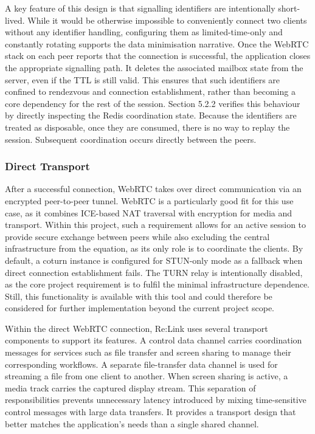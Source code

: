 \documentclass[12pt,a4paper]{article}
\begin{document}
A key feature of this design is that signalling identifiers are intentionally short-lived. While it would be otherwise impossible to conveniently connect two clients without any identifier handling, configuring them as limited-time-only and constantly rotating supports the data minimisation narrative. Once the WebRTC stack on each peer reports that the connection is successful, the application closes the appropriate signalling path. It deletes the associated mailbox state from the server, even if the TTL is still valid. This ensures that such identifiers are confined to rendezvous and connection establishment, rather than becoming a core dependency for the rest of the session. Section 5.2.2 verifies this behaviour by directly inspecting the Redis coordination state. Because the identifiers are treated as disposable, once they are consumed, there is no way to replay the session. Subsequent coordination occurs directly between the peers.

\subsubsection{Direct Transport}

After a successful connection, WebRTC takes over direct communication via an encrypted peer-to-peer tunnel. WebRTC is a particularly good fit for this use case, as it combines ICE-based NAT traversal with encryption for media and transport. Within this project, such a requirement allows for an active session to provide secure exchange between peers while also excluding the central infrastructure from the equation, as its only role is to coordinate the clients. By default, a coturn instance is configured for STUN-only mode as a fallback when direct connection establishment fails. The TURN relay is intentionally disabled, as the core project requirement is to fulfil the minimal infrastructure dependence. Still, this functionality is available with this tool and could therefore be considered for further implementation beyond the current project scope.

Within the direct WebRTC connection, Re:Link uses several transport components to support its features. A control data channel carries coordination messages for services such as file transfer and screen sharing to manage their corresponding workflows. A separate file-transfer data channel is used for streaming a file from one client to another. When screen sharing is active, a media track carries the captured display stream. This separation of responsibilities prevents unnecessary latency introduced by mixing time-sensitive control messages with large data transfers. It provides a transport design that better matches the application’s needs than a single shared channel.
\end{document}
